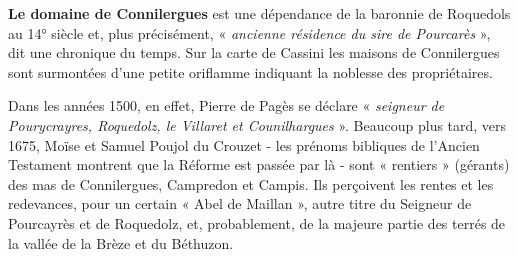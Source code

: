 \vspace{0.2cm}

\textbf{Le domaine de Connilergues} est une dépendance de la baronnie de Roquedols au 14° siècle
et, plus précisément, « \textit{ancienne résidence du sire de Pourcarès} », dit une chronique du temps.
Sur la carte de Cassini les maisons de Connilergues sont surmontées d’une petite oriflamme
indiquant la noblesse des propriétaires.

\vspace{0.2cm}

Dans les années 1500, en effet, Pierre de Pagès se déclare « \textit{seigneur de Pourycrayres,
Roquedolz, le Villaret et Counilhargues} ». Beaucoup plus tard, vers 1675, Moïse et Samuel
Poujol du Crouzet - les prénoms bibliques de l’Ancien Testament montrent que la Réforme
est passée par là - sont « rentiers » (gérants) des mas de Connilergues, Campredon et Campis.
Ils perçoivent les rentes et les redevances, pour un certain « Abel de Maillan », autre titre du
Seigneur de Pourcayrès et de Roquedolz, et, probablement, de la majeure partie des terrés
de la vallée de la Brèze et du Béthuzon.
